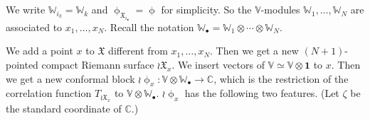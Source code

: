 \documentclass[11pt,b5paper,notitlepage]{article}
\theoremstyle{definition}
\theoremstyle{plain}
\newcommand{\fk}{\mathfrak}
\newcommand{\wht}{\widehat}
\newcommand{\ovl}{\overline}
\newcommand{\id}{\mathbf{1}}
\newcommand{\blt}{\bullet}
\newcommand{\Vbb}{\mathbb V}
\newcommand{\Wbb}{\mathbb W}
\newcommand{\Cbb}{\mathbb C}
\numberwithin{equation}{section}
\begin{document}



\subsection{}\label{lb160}
We write $\Wbb_{i_k}=\Wbb_k$ and $\upphi_{\fk X_{i_\blt}}=\upphi$ for simplicity. So the $\Vbb$-modules $\Wbb_1,\dots,\Wbb_N$ are associated to $x_1,\dots,x_N$. Recall the notation $\Wbb_\blt=\Wbb_1\otimes\cdots\otimes\Wbb_N$.

We add a point $x$ to $\fk X$ different from $x_1,\dots,x_N$. Then we get a new $(N+1)$-pointed compact Riemann surface $\wr\fk X_x$. We insert vectors of $\Vbb\simeq \Vbb\otimes\id$ to $x$. Then we get a new conformal block $\wr\upphi_x:\Vbb\otimes\Wbb_\blt\rightarrow\Cbb$, which is the restriction of the correlation function $T_{\wr\fk X_x}$ to $\Vbb\otimes\Wbb_\blt$. $\wr\upphi_x$ has the following two features. (Let $\zeta$ be the standard coordinate of $\Cbb$.)
\end{document}
